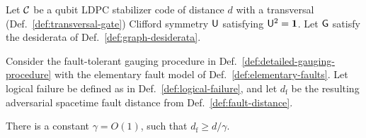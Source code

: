 \documentclass[11pt]{article}
\begin{document}
\begin{theorem} \label{thm:spacetime-distance}
    Let $\mathcal{C}$ be a qubit LDPC stabilizer code of distance $d$ with a transversal (Def.~\ref{def:transversal-gate}) Clifford symmetry $\mathsf{U}$ satisfying $\mathsf{U}^2=\mathbf{1}$. Let $\mathsf{G}$ satisfy the desiderata of Def.~\ref{def:graph-desiderata}.
    
    Consider the fault-tolerant gauging procedure in Def.~\ref{def:detailed-gauging-procedure} with the elementary fault model of Def.~\ref{def:elementary-faults}.
    Let logical failure be defined as in Def.~\ref{def:logical-failure}, and let $d_{\mathrm{f}}$ be the resulting adversarial spacetime fault distance from Def.~\ref{def:fault-distance}.

    There is a constant $\gamma = O(1)$, such that  $d_\mathrm{f}\ge d/\gamma$.
\end{theorem}
\end{document}
